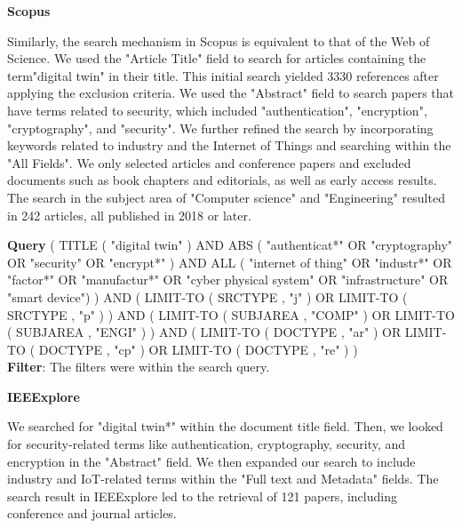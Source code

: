 
\textbf{Scopus}

Similarly, the search mechanism in Scopus is equivalent to that of the Web of Science. We used the "Article Title" field to search for articles containing the term"digital twin" in their title. This initial search yielded 3330 references after applying the exclusion criteria. We used the "Abstract" field to search papers that have terms related to security, which included  "authentication", "encryption", "cryptography", and "security". We further refined the search by incorporating keywords related to industry and the Internet of Things and searching within the "All Fields". We only selected articles and conference papers and excluded documents such as book chapters and editorials, as well as early access results. The search in the subject area of "Computer science" and "Engineering" resulted in 242 articles, all published in 2018 or later.

\begin{tcolorbox}[colback=black!5!white, sharp corners=all, colframe=white!95!black]
\textbf{Query}
\tcblower
( TITLE ( "digital twin" )  AND  ABS ( "authenticat*"  OR  "cryptography"  OR  "security"  OR  "encrypt*" )  AND  ALL ( "internet of thing" OR "industr*"  OR  "factor*"  OR  "manufactur*"  OR  "cyber physical system"  OR  "infrastructure" OR "smart device") )  AND  ( LIMIT-TO ( SRCTYPE ,  "j" )  OR  LIMIT-TO ( SRCTYPE ,  "p" ) )  AND  ( LIMIT-TO ( SUBJAREA ,  "COMP" )  OR  LIMIT-TO ( SUBJAREA ,  "ENGI" ) )  AND  ( LIMIT-TO ( DOCTYPE ,  "ar" )  OR  LIMIT-TO ( DOCTYPE ,  "cp" )  OR  LIMIT-TO ( DOCTYPE ,  "re" ) )\\

\textbf{Filter}: The filters were within the search query.
\end{tcolorbox}


\textbf{IEEExplore}

We searched for "digital twin*" within the document title field. Then, we looked for security-related terms like authentication, cryptography, security, and encryption in the "Abstract" field. We then expanded our search to include industry and IoT-related terms within the "Full text and Metadata" fields. The search result in IEEExplore led to the retrieval of 121 papers, including conference and journal articles.

